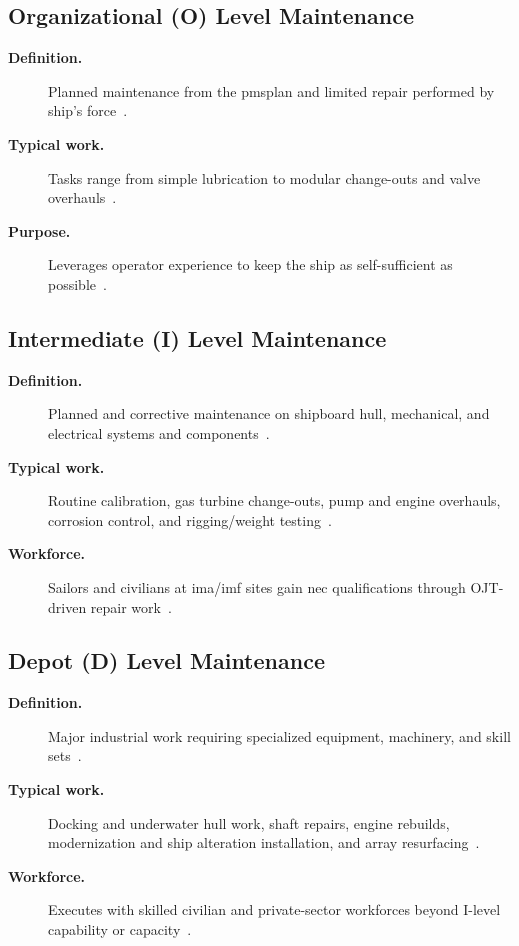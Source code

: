 \documentclass[../main.tex]{subfiles}
\begin{document}
\subsection{Organizational (O) Level Maintenance}
\begin{description}
  \item[\textbf{Definition.}] Planned maintenance from the \ac{pmsplan} and limited repair performed by ship's force~\autocite{edo-4-1-1-fleet-maint-assets-2025}.
  \item[\textbf{Typical work.}] Tasks range from simple lubrication to modular change-outs and valve overhauls~\autocite{edo-4-1-1-fleet-maint-assets-2025}.
  \item[\textbf{Purpose.}] Leverages operator experience to keep the ship as self-sufficient as possible~\autocite{edo-4-1-1-fleet-maint-assets-2025}.
\end{description}

\subsection{Intermediate (I) Level Maintenance}
\begin{description}
  \item[\textbf{Definition.}] Planned and corrective maintenance on shipboard hull, mechanical, and electrical systems and components~\autocite{edo-4-1-1-fleet-maint-assets-2025}.
  \item[\textbf{Typical work.}] Routine calibration, gas turbine change-outs, pump and engine overhauls, corrosion control, and rigging/weight testing~\autocite{edo-4-1-1-fleet-maint-assets-2025}.
  \item[\textbf{Workforce.}] Sailors and civilians at \ac{ima}/\ac{imf} sites gain \ac{nec} qualifications through OJT-driven repair work~\autocite{edo-4-1-1-fleet-maint-assets-2025}.
\end{description}

\subsection{Depot (D) Level Maintenance}
\begin{description}
  \item[\textbf{Definition.}] Major industrial work requiring specialized equipment, machinery, and skill sets~\autocite{edo-4-1-1-fleet-maint-assets-2025}.
  \item[\textbf{Typical work.}] Docking and underwater hull work, shaft repairs, engine rebuilds, modernization and ship alteration installation, and array resurfacing~\autocite{edo-4-1-1-fleet-maint-assets-2025}.
  \item[\textbf{Workforce.}] Executes with skilled civilian and private-sector workforces beyond I-level capability or capacity~\autocite{edo-4-1-1-fleet-maint-assets-2025}.
\end{description}
\end{document}
